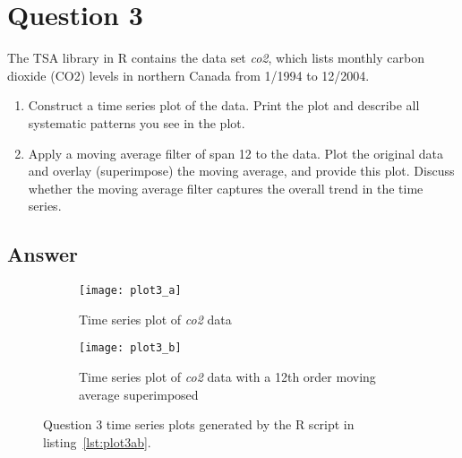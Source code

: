 \documentclass[10pt]{fphw}
\begin{document}
\section*{Question 3}

\begin{problem}
The TSA library in R contains the data set \emph{co2}, which lists monthly carbon dioxide (CO2)
levels in northern Canada from 1/1994 to 12/2004.
\medskip
\begin{enumerate}   
\item Construct a time series plot of the data. Print the plot and describe all systematic patterns you
see in the plot.
\item Apply a moving average filter of span 12 to the data.
Plot the original data and overlay (superimpose)
the moving average, and provide this plot.
Discuss whether the moving average filter captures the
overall trend in the time series.
\end{enumerate}
\end{problem}

\subsection*{Answer}


\begin{figure}
	\centering
	\begin{subfigure}{.5\textwidth}
		\centering
		\texttt{[image: plot3\_a]}
		\caption{Time series plot of \emph{co2} data}
		\label{fig:sub1}
	\end{subfigure}%
	\begin{subfigure}{.5\textwidth}
		\centering
		\texttt{[image: plot3\_b]}
		\caption{Time series plot of \emph{co2} data with a 12th order moving average superimposed}
		\label{fig:sub2}
	\end{subfigure}
	\caption{Question 3 time series plots generated by the R script in listing~\ref{lst:plot3ab}.}
	\label{fig:p3_plots}
\end{figure}
\end{document}
